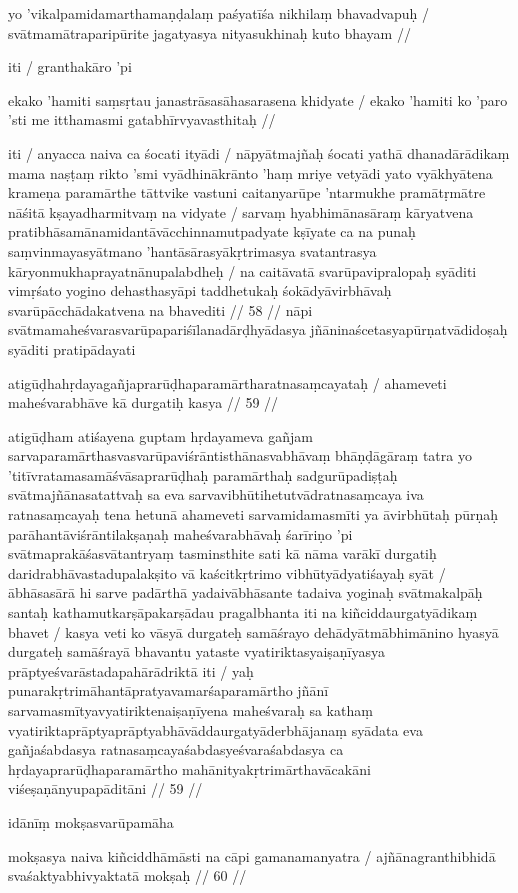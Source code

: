 yo 'vikalpamidamarthamaṇḍalaṃ paśyatīśa nikhilaṃ bhavadvapuḥ  /
svātmamātraparipūrite jagatyasya nityasukhinaḥ kuto bhayam  //

iti  / granthakāro 'pi

ekako 'hamiti saṃsṛtau janastrāsasāhasarasena khidyate  /
ekako 'hamiti ko 'paro 'sti me itthamasmi gatabhīrvyavasthitaḥ  //

iti  / anyacca naiva ca śocati ityādi  / nāpyātmajñaḥ śocati yathā dhanadārādikaṃ mama naṣṭaṃ rikto 'smi vyādhinākrānto 'haṃ mriye vetyādi yato vyākhyātena krameṇa paramārthe tāttvike vastuni caitanyarūpe 'ntarmukhe pramātṛmātre nāśitā kṣayadharmitvaṃ na vidyate  / sarvaṃ hyabhimānasāraṃ kāryatvena pratibhāsamānamidantāvācchinnamutpadyate kṣīyate ca na punaḥ saṃvinmayasyātmano 'hantāsārasyākṛtrimasya svatantrasya kāryonmukhaprayatnānupalabdheḥ  / na caitāvatā svarūpavipralopaḥ syāditi vimṛśato yogino dehasthasyāpi taddhetukaḥ śokādyāvirbhāvaḥ svarūpācchādakatvena na bhavediti  // 58  //
nāpi svātmamaheśvarasvarūpapariśīlanadārḍhyādasya jñāninaścetasyapūrṇatvādidoṣaḥ syāditi pratipādayati

atigūḍhahṛdayagañjaprarūḍhaparamārtharatnasaṃcayataḥ  /
ahameveti maheśvarabhāve kā durgatiḥ kasya  // 59  //

atigūḍham atiśayena guptam hṛdayameva gañjam sarvaparamārthasvasvarūpaviśrāntisthānasvabhāvaṃ bhāṇḍāgāraṃ tatra yo 'titīvratamasamāśvāsaprarūḍhaḥ paramārthaḥ sadgurūpadiṣṭaḥ svātmajñānasatattvaḥ sa eva sarvavibhūtihetutvādratnasaṃcaya iva ratnasaṃcayaḥ tena hetunā ahameveti sarvamidamasmīti ya āvirbhūtaḥ pūrṇaḥ parāhantāviśrāntilakṣaṇaḥ maheśvarabhāvaḥ śarīriṇo 'pi svātmaprakāśasvātantryaṃ tasminsthite sati kā nāma varākī durgatiḥ daridrabhāvastadupalakṣito vā kaścitkṛtrimo vibhūtyādyatiśayaḥ syāt  / ābhāsasārā hi sarve padārthā yadaivābhāsante tadaiva yoginaḥ svātmakalpāḥ santaḥ kathamutkarṣāpakarṣādau pragalbhanta iti na kiñciddaurgatyādikaṃ bhavet  / kasya veti ko vāsyā durgateḥ samāśrayo dehādyātmābhimānino hyasyā durgateḥ samāśrayā bhavantu yataste vyatiriktasyaiṣaṇīyasya prāptyeśvarāstadapahārādriktā iti  / yaḥ punarakṛtrimāhantāpratyavamarśaparamārtho jñānī sarvamasmītyavyatiriktenaiṣaṇīyena maheśvaraḥ sa kathaṃ vyatiriktaprāptyaprāptyabhāvāddaurgatyāderbhājanaṃ syādata eva gañjaśabdasya ratnasaṃcayaśabdasyeśvaraśabdasya ca hṛdayaprarūḍhaparamārtho mahānityakṛtrimārthavācakāni viśeṣaṇānyupapāditāni  // 59  //

idānīṃ mokṣasvarūpamāha

mokṣasya naiva kiñciddhāmāsti na cāpi gamanamanyatra  /
ajñānagranthibhidā svaśaktyabhivyaktatā mokṣaḥ  // 60  //

